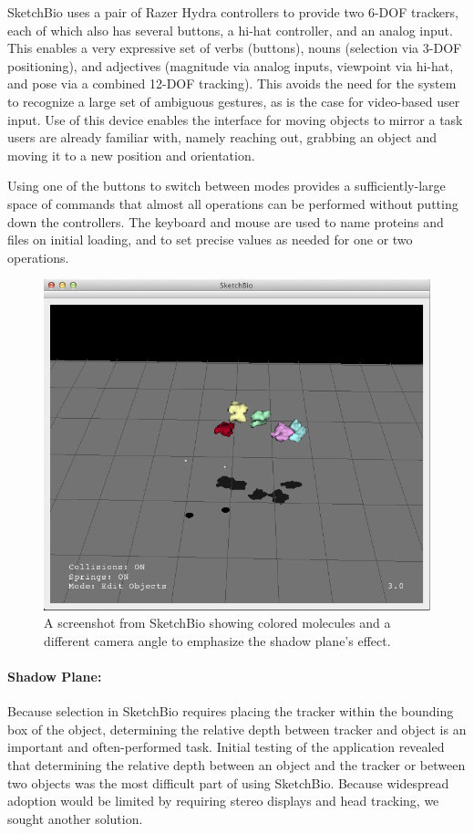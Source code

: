 \documentclass[twocolumn]{bmcart}%
\begin{document}
SketchBio uses a pair of Razer Hydra controllers to provide two 6-DOF trackers, each of which also has several buttons, a hi-hat controller, and an analog input.
This enables a very expressive set of verbs (buttons), nouns (selection via 3-DOF positioning), and adjectives (magnitude via analog inputs, viewpoint via hi-hat, and pose via a combined 12-DOF tracking).
This avoids the need for the system to recognize a large set of ambiguous gestures, as is the case for video-based user input.
Use of this device enables the interface for moving objects to mirror a task users are already familiar with, namely reaching out, grabbing an object and moving it to a new position and orientation.

Using one of the buttons to switch between modes provides a sufficiently-large space of commands that almost all operations can be performed without putting down the controllers.
The keyboard and mouse are used to name proteins and files on initial loading, and to set precise values as needed for one or two operations.

\begin{figure}[h]
\centering
\includegraphics[width=0.9\columnwidth]{shadow_plane.png}
\caption{A screenshot from SketchBio showing colored molecules and a different camera angle to emphasize the shadow plane's effect.}
\label{fig:shadow_plane}
\end{figure}

\paragraph*{Shadow Plane:}
Because selection in SketchBio requires placing the tracker within the bounding box of the object, determining the relative depth between tracker and object is an important and often-performed task.
Initial testing of the application revealed that determining the relative depth between an object and the tracker or between two objects was the most difficult part of using SketchBio.
Because widespread adoption would be limited by requiring stereo displays and head tracking, we sought another solution.
\end{document}
